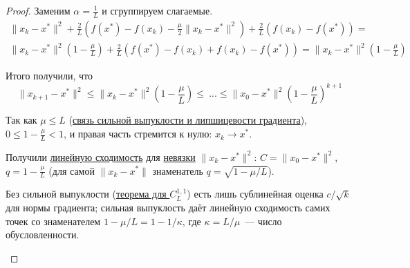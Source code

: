 \begin{proof}
  Заменим $\alpha = \frac{1}{L}$ и сгруппируем слагаемые.
  \begin{multline*}
  \|x_k - x^{*}\|^2 + \frac{2}{L} \left( f(x^{*}) - f(x_k) - \frac{\mu}{2} \|x_k - x^{*}\|^2\right) + \frac{2}{L} (f(x_k) - f(x^{*})) = \\
  \| x_k - x^{*}\|^2 \left( 1 - \frac{\mu}{L} \right) + \frac{2}{L} (f(x^{*}) - f(x_k) + f(x_k) - f(x^{*})) = \| x_k - x^{*}\|^2 \left( 1 - \frac{\mu}{L} \right)
  \end{multline*}

  Итого получили, что
  \[
  \| x_{k+1} - x^{*}\|^2 \le \|x_k - x^{*}\|^2 \left( 1- \frac{\mu}{L} \right) \le \ ... \le
  \|x_0 - x^{*}\|^2 \left( 1- \frac{\mu}{L} \right)^{k+1}
  \]

  Так как $\mu \le L$ (\hyperref[note:3C6CF60E-0773-488E-A0B9-4D7510D456C0]{связь сильной выпуклости и липшицевости градиента}), $0 \le 1 - \frac{\mu}{L} < 1$, и правая часть стремится к нулю: $x_k \to x^{*}$.

  Получили \hyperref[note:DF2405BF-8B31-47EB-8DEF-B1A88034717C]{линейную сходимость} для \hyperref[note:C42D2C19-B35F-4C0E-AFEB-D880CBB72176]{невязки} $\|x_{k} - x^{*}\|^2$: $C = \|x_0- x^{*}\|^2$, $q = 1 -\frac{\mu}{L}$ (для самой $\|x_k - x^{*}\|$ знаменатель $q = \sqrt{1 - \mu/L}$).

  \begin{remark}
    Без сильной выпуклости (\hyperref[note:C3B64D64-D35B-42AC-B683-6736227CBBBC]{теорема для $C^{1,1}_L$}) есть лишь сублинейная оценка $c/\sqrt{k}$ для нормы градиента; сильная выпуклость даёт линейную сходимость самих точек со знаменателем $1 - \mu/L = 1 - 1/\kappa$, где $\kappa = L/\mu$~--- число обусловленности.
  \end{remark}
\end{proof}
